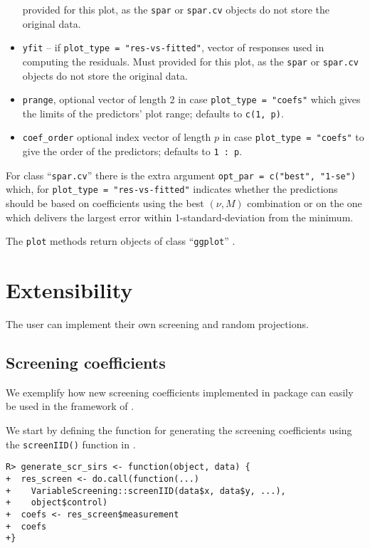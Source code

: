 \documentclass[
  article]{jss}
\begin{document}
\begin{itemize}
  provided for this plot, as the \texttt{spar} or \texttt{spar.cv}
  objects do not store the original data.
\item
  \texttt{yfit} -- if \texttt{plot\_type\ =\ "res-vs-fitted"}, vector of
  responses used in computing the residuals. Must provided for this
  plot, as the \texttt{spar} or \texttt{spar.cv} objects do not store
  the original data.
\item
  \texttt{prange}, optional vector of length 2 in case
  \texttt{plot\_type\ =\ "coefs"} which gives the limits of the
  predictors' plot range; defaults to \texttt{c(1,\ p)}.
\item
  \texttt{coef\_order} optional index vector of length \(p\) in case
  \texttt{plot\_type\ =\ "coefs"} to give the order of the predictors;
  defaults to \texttt{1\ :\ p}.
\end{itemize}

For class ``\texttt{spar.cv}'' there is the extra argument
\texttt{opt\_par\ =\ c("best",\ "1-se")} which, for
\texttt{plot\_type\ =\ "res-vs-fitted"} indicates whether the
predictions should be based on coefficients using the best \((\nu, M)\)
combination or on the one which delivers the largest error within
1-standard-deviation from the minimum.

The \texttt{plot} methods return objects of class ``\texttt{ggplot}''
\citet{ggplotR}.

\section{Extensibility}\label{extensibility}

The user can implement their own screening and random projections.

\subsection{Screening coefficients}\label{sec-extensscrcoef}

We exemplify how new screening coefficients implemented in package
 can easily be used in the framework of
.

We start by defining the function for generating the screening
coefficients using the \texttt{screenIID()} function in
.

\begin{verbatim}
R> generate_scr_sirs <- function(object, data) {
+  res_screen <- do.call(function(...) 
+    VariableScreening::screenIID(data$x, data$y, ...), 
+    object$control)
+  coefs <- res_screen$measurement
+  coefs
+}
\end{verbatim}
\end{document}
